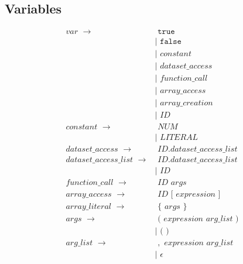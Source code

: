 \documentclass{article}
\newcommand{\code}{\texttt}
\begin{document}
\subsection{Variables}
\begin{align*}
var\,\,\rightarrow&\,\,\code{true}\\
                    & |\,\,\code{false}\\
                    & |\,\,constant\\
                    & |\,\,dataset\_access\\
                    & |\,\,function\_call\\
                    & |\,\,array\_access\\
                    & |\,\,array\_creation\\
                    & |\,\,ID\\
constant\,\,\rightarrow&\,\,NUM\\
                    & |\,\,LITERAL\\
dataset\_access\,\,\rightarrow&\,\,ID\code{.}dataset\_access\_list\\
dataset\_access\_list\,\,\rightarrow&\,\,ID\code{.} dataset\_access\_list\\
                    & |\,\,ID\\
function\_call\,\,\rightarrow&\,\,ID\,\,args\\
array\_access\,\,\rightarrow&\,\,ID\,\,\code{[}\,\,expression\,\,\code{]}\\
array\_literal\,\,\rightarrow&\,\,\code{\{}\,\,args\,\,\code{\}}\\
args\,\,\rightarrow&\,\,\code{(}\,\,expression\,\,arg\_list\,\,\code{)}\\
                    & |\,\,\code{(}\,\,\code{)}\\
arg\_list\,\,\rightarrow&\,\,,\,\,expression\,\,arg\_list\\
                    & |\,\,\epsilon
\end{align*}
\end{document}
